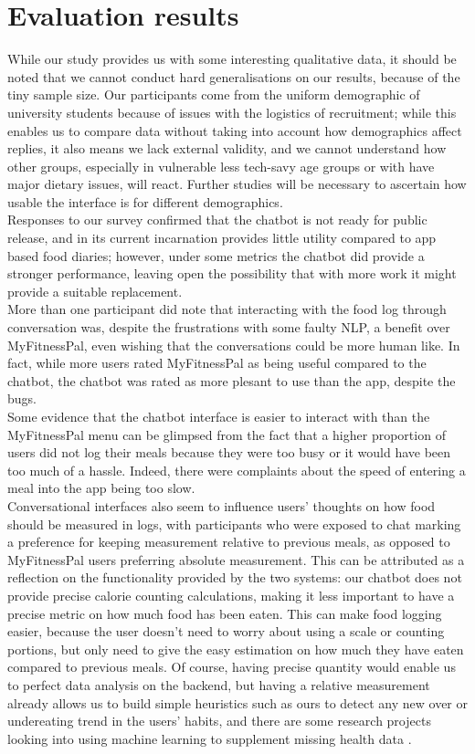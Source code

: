 \section{Evaluation results}
While our study provides us with some interesting qualitative data, it should be noted that we cannot conduct hard generalisations on our results, because of the tiny sample size. Our participants come from the uniform demographic of university students because of issues with the logistics of recruitment; while this enables us to compare data without taking into account how demographics affect replies, it also means we lack external validity, and we cannot understand how other groups, especially in vulnerable less tech-savy age groups or with have major dietary issues, will react. Further studies will be necessary to ascertain how usable the interface is for different demographics. \\
Responses to our survey confirmed that the chatbot is not ready for public release, and in its current incarnation provides little utility compared to app based food diaries; however, under some metrics the chatbot did provide a stronger performance, leaving open the possibility that with more work it might provide a suitable replacement. \\
More than one participant did note that interacting with the food log through conversation was, despite the frustrations with some faulty NLP, a benefit over MyFitnessPal, even wishing that the conversations could be more human like. In fact, while more users rated MyFitnessPal as being useful compared to the chatbot, the chatbot was rated as more plesant to use than the app, despite the bugs. \\
Some evidence that the chatbot interface is easier to interact with than the MyFitnessPal menu can be glimpsed from the fact that a higher proportion of users did not log their meals because they were too busy or it would have been too much of a hassle. Indeed, there were complaints about the speed of entering a meal into the app being too slow.\\
Conversational interfaces also seem to influence users' thoughts on how food should be measured in logs, with participants who were exposed to chat marking a preference for keeping measurement relative to previous meals, as opposed to MyFitnessPal users preferring absolute measurement. This can be attributed as a reflection on the functionality provided by the two systems: our chatbot does not provide precise calorie counting calculations, making it less important to have a precise metric on how much food has been eaten. This can make food logging easier, because the user doesn't need to worry about using a scale or counting portions, but only need to give the easy estimation on how much they have eaten compared to previous meals. Of course, having precise quantity would enable us to perfect data analysis on the backend, but having a relative measurement already allows us to build simple heuristics such as ours to detect any new over or undereating trend in the users' habits, and there are some research projects looking into using machine learning to supplement missing health data \cite{wolters}. \\
